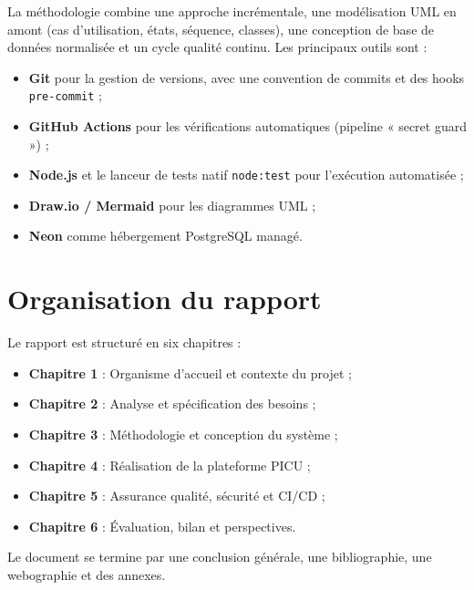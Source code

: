 La méthodologie combine une approche incrémentale, une modélisation UML en amont (cas d'utilisation, états, séquence, classes), une conception de base de données normalisée et un cycle qualité continu. Les principaux outils sont :

\begin{itemize}
    \item \textbf{Git} pour la gestion de versions, avec une convention de commits et des hooks \texttt{pre-commit} ;
    \item \textbf{GitHub Actions} pour les vérifications automatiques (pipeline « secret guard ») ;
    \item \textbf{Node.js} et le lanceur de tests natif \texttt{node:test} pour l'exécution automatisée ;
    \item \textbf{Draw.io / Mermaid} pour les diagrammes UML ;
    \item \textbf{Neon} comme hébergement PostgreSQL managé.
\end{itemize}

\section{Organisation du rapport}

Le rapport est structuré en six chapitres :

\begin{itemize}
    \item \textbf{Chapitre 1} : Organisme d'accueil et contexte du projet ;
    \item \textbf{Chapitre 2} : Analyse et spécification des besoins ;
    \item \textbf{Chapitre 3} : Méthodologie et conception du système ;
    \item \textbf{Chapitre 4} : Réalisation de la plateforme PICU ;
    \item \textbf{Chapitre 5} : Assurance qualité, sécurité et CI/CD ;
    \item \textbf{Chapitre 6} : Évaluation, bilan et perspectives.
\end{itemize}

Le document se termine par une conclusion générale, une bibliographie, une webographie et des annexes.
